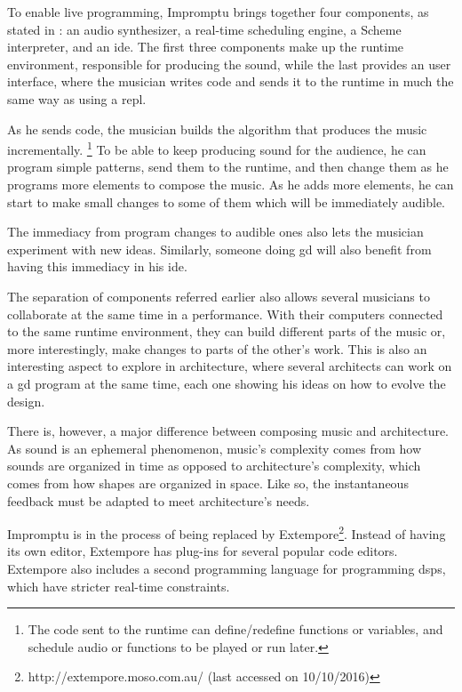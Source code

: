 To enable live programming, Impromptu brings together four components, as stated in \cite{sorensen2005impromptu}: an audio synthesizer, a real-time scheduling engine, a Scheme interpreter, and an \gls{ide}.
The first three components make up the runtime environment, responsible for producing the sound, while the last provides an user interface, where the musician writes code and sends it to the runtime in much the same way as using a \gls{repl}.

As he sends code, the musician builds the algorithm that produces the music incrementally.%
\footnote{The code sent to the runtime can define/redefine functions or variables, and schedule audio or functions to be played or run later.}
To be able to keep producing sound for the audience, he can program simple patterns, send them to the runtime, and then change them as he programs more elements to compose the music.
As he adds more elements, he can start to make small changes to some of them which will be immediately audible.

The immediacy from program changes to audible ones also lets the musician experiment with new ideas.
Similarly, someone doing \gls{gd} will also benefit from having this immediacy in his \gls{ide}.

The separation of components referred earlier also allows several musicians to collaborate at the same time in a performance\cite{sorensen2005impromptu}.
With their computers connected to the same runtime environment, they can build different parts of the music or, more interestingly, make changes to parts of the other's work.
This is also an interesting aspect to explore in architecture, where several architects can work on a \gls{gd} program at the same time, each one showing his ideas on how to evolve the design.

There is, however, a major difference between composing music and architecture.
As sound is an ephemeral phenomenon, music's complexity comes from how sounds are organized in time as opposed to architecture's complexity, which comes from how shapes are organized in space.
Like so, the instantaneous feedback must be adapted to meet architecture's needs.

Impromptu is in the process of being replaced by Extempore\footnote{http://extempore.moso.com.au/ (last accessed on 10/10/2016)}.
Instead of having its own editor, Extempore has plug-ins for several popular code editors.
Extempore also includes a second programming language for programming \glspl{dsp}, which have stricter real-time constraints.



